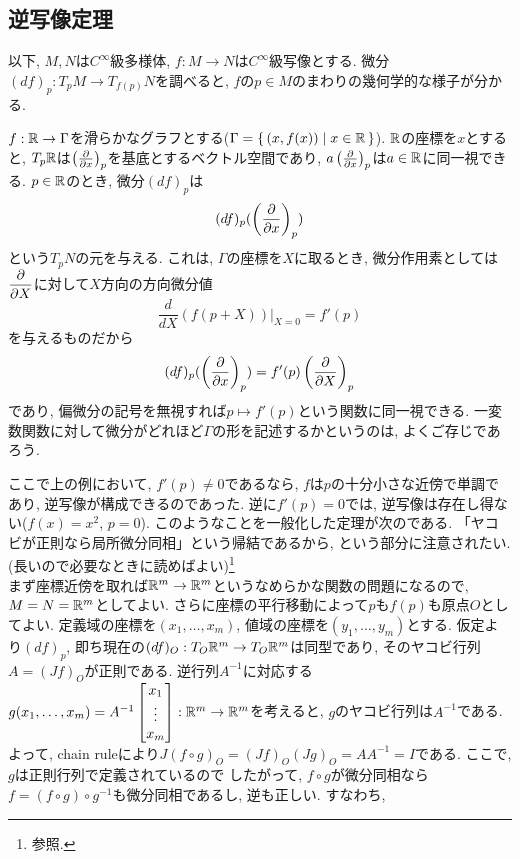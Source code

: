 \subsection{逆写像定理}
以下, $M,N$は$C^{\infty}$級多様体, $f:M\to N$は$C^{\infty}$級写像とする.
微分$(df)_p: T_{p}M \to T_{f(p)}N$を調べると, $f$の$p\in M$のまわりの幾何学的な様子が分かる. \begin{eg}
$f:\mathbb{R}\to \Gamma$を滑らかなグラフとする($\Gamma = \set{(x,f(x)) \mid x\in \mathbb{R}}$). $\mathbb{R}$の座標を$x$とすると,  $T_{p}\mathbb{R}$は$\left( \frac{\partial}{\partial x} \right)_{p}$を基底とするベクトル空間であり, $a\left( \frac{\partial }{\partial x} \right)_{p}$は$a\in \mathbb{R}$に同一視できる. $p\in \mathbb{R}$のとき, 微分$(df)_{p}$は
\[(df)_{p}(\left( \dfrac{\partial}{\partial x} \right)_{p})\]
という$T_{p}N$の元を与える. これは, $\Gamma$の座標を$X$に取るとき, 微分作用素としては$\dfrac{\partial}{\partial X}$に対して$X$方向の方向微分値
\[\dfrac{d}{dX}(f(p+X))|_{X=0} = f'(p)\]
を与えるものだから
\[(df)_{p}(\left( \dfrac{\partial}{\partial x} \right)_{p}) = f'(p)\left( \dfrac{\partial}{\partial X} \right)_{p}\]
であり, 偏微分の記号を無視すれば$p\mapsto f'(p)$という関数に同一視できる.
一変数関数に対して微分がどれほど$\Gamma$の形を記述するかというのは, よくご存じであろう.
\end{eg}
ここで上の例において, $f'(p)\neq 0$であるなら, $f$は$p$の十分小さな近傍で単調であり, 逆写像が構成できるのであった. 逆に$f'(p) = 0$では, 逆写像は存在し得ない($f(x) = x^2$, $p=0$). このようなことを一般化した定理が次のである.
「ヤコビが正則なら局所微分同相」という帰結であるから, という部分に注意されたい. \\
\prf (長いので必要なときに読めばよい)\footnote{\cite{matsumoto}参照. }\\
まず座標近傍を取れば$\mathbb{R}^{m}\to \mathbb{R}^m$というなめらかな関数の問題になるので, $M=N=\mathbb{R}^m$としてよい. さらに座標の平行移動によって$p$も$f(p)$も原点$O$としてよい. 定義域の座標を$(x_1,\dots,x_m)$, 値域の座標を$(y_1,\dots,y_m)$とする. 仮定より$(df)_{p}$, 即ち現在の$(df)_{O}:T_O \mathbb{R}^m \to T_O \mathbb{R}^m$は同型であり, そのヤコビ行列$A=(Jf)_{O}$が正則である.  逆行列$A^{-1}$に対応する$g(x_1,\dots, x_m) = A^{-1} \begin{bmatrix}x_1\\ \vdots \\ x_m\end{bmatrix}: \mathbb{R}^m\to \mathbb{R}^m$を考えると, $g$のヤコビ行列は$A^{-1}$である. よって, chain ruleにより$J(f\circ g)_{O} = (Jf)_{O}(Jg)_{O} = AA^{-1} = I$である. ここで, $g$は正則行列で定義されているので したがって, $f\circ g$が微分同相なら$f=(f\circ g)\circ g^{-1}$も微分同相であるし, 逆も正しい. すなわち,
